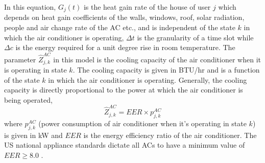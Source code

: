 \documentclass[10pt,twocolumn,twoside]{IEEEtran}
\begin{document}
In this equation, $G_j(t)$ is the heat gain rate of the house of user $j$ which depends on heat gain coefficients of the walls, windows, roof, solar radiation, people and air change rate of the AC etc., and is independent of the state $k$ in which the air conditioner is operating, $\Delta{t}$ is the granularity of a time slot while $\Delta{c}$ is the energy required for a unit degree rise in room temperature. The parameter $\hat{Z}^{AC}_{j,k}$ in this model is the cooling capacity of the air conditioner when it is operating in state $k$. The cooling capacity is given in BTU/hr and is a function of the state $k$ in which the air conditioner is operating. Generally, the cooling capacity is directly proportional to the power at which the air conditioner is being operated, \begin{equation}
\hat{Z}^{AC}_{j,k} = \textit{EER} \times p^{AC}_{j,k} 
\end{equation}
where $p^{AC}_{j,k}$ (power consumption of air conditioner when it's operating in state $k$) is given in kW and $EER$ is the energy efficiency ratio of the air conditioner. The US national appliance standards dictate all ACs to have a minimum value of $EER \geq 8.0$ \cite{energygov}.
\end{document}
